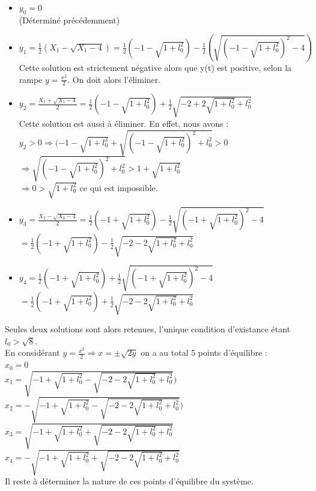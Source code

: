 \documentclass[10pt,a4paper]{article}
\begin{document}
\begin{itemize}
\item $y_0=0$\\
(Déterminé précédemment)\\
\item $y_1=\frac{1}{2}(X_1-\sqrt{X_1-4})=\frac{1}{2}(-1-\sqrt{1+l_0^2})-\frac{1}{2}(\sqrt{(-1-\sqrt{1+l_0^2})^2-4})$\\
Cette solution est strictement négative alors que y(t) est positive, selon la rampe $y=\frac{x^2}{2}$. On doit alors l'éliminer.\\
\item $y_2=\frac{X_1+\sqrt{X_1-4}}{2}=\frac{1}{2}(-1-\sqrt{1+l_0^2})+\frac{1}{2}\sqrt{-2+2\sqrt{1+l_0^2}+l_0^2}$\\
Cette solution est aussi à éliminer. En effet, nous avons : \\
$y_2 >0 \Rightarrow (-1-\sqrt{1+l_0^2}+\sqrt{(-1-\sqrt{1+l_0^2})^2+l_0^2} > 0$\\$\Rightarrow \sqrt{(-1-\sqrt{1+l_0^2})^2+l_0^2}>1+\sqrt{1+l_0^2}$\\$ \Rightarrow 0>\sqrt{1+l_0^2}$ ce qui est impossible.
\item $y_3=\frac{X_2-\sqrt{X_2-4}}{2}=\frac{1}{2}(-1+\sqrt{1+l_0^2})-\frac{1}{2}\sqrt{(-1+\sqrt{1+l_0^2})^2-4}$\\
$=\frac{1}{2}(-1+\sqrt{1+l_0^2})-\frac{1}{2}\sqrt{-2-2\sqrt{1+l_0^2}+l_0^2}$\\
\item $y_4=\frac{1}{2}(-1+\sqrt{1+l_0^2})+\frac{1}{2}\sqrt{(-1+\sqrt{1+l_0^2})^2-4}$\\
$=\frac{1}{2}(-1+\sqrt{1+l_0^2})+\frac{1}{2}\sqrt{-2-2\sqrt{1+l_0^2}+l_0^2}$\\
\end{itemize}
Seules deux solutions sont alors retenues, l'unique condition d'existance étant $l_0>\sqrt{8}$.\\
En considérant $y=\frac{x^2}{2} \Longrightarrow x=\pm \sqrt{2y}$ on a au total 5 points d'équilibre :\\
$x_0=0$\\
$x_1=\sqrt{-1+\sqrt{1+l_0^2}-\sqrt{-2-2\sqrt{1+l_0^2}+l_0^2}})$\\
$x_2=-\sqrt{-1+\sqrt{1+l_0^2}-\sqrt{-2-2\sqrt{1+l_0^2}+l_0^2}})$\\
$x_3=\sqrt{-1+\sqrt{1+l_0^2}+\sqrt{-2-2\sqrt{1+l_0^2}+l_0^2}}$\\
$x_4=-\sqrt{-1+\sqrt{1+l_0^2}+\sqrt{-2-2\sqrt{1+l_0^2}+l_0^2}}$\\
Il reste à déterminer la nature de ces points d'équilibre du système.
\end{document}
